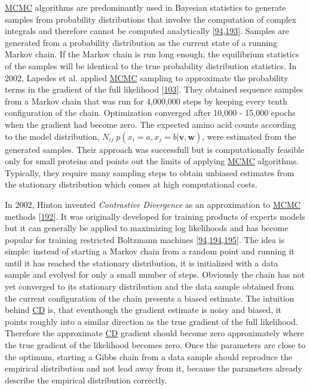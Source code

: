 \documentclass[11pt,a4paper,twoside]{book}
\newcommand{\eq}{\!=\!}
\renewcommand{\v}{\mathbf{v}}
\newcommand{\w}{\mathbf{w}}
\theoremstyle{definition}
\theoremstyle{definition}
\theoremstyle{remark}
\begin{document}
\protect\hyperlink{abbrev}{MCMC} algorithms are predominantly used in
Bayesian statistics to generate samples from probability distributions
that involve the computation of complex integrals and therefore cannot
be computed analytically
{[}\protect\hyperlink{ref-Murphy2012}{94},\protect\hyperlink{ref-Andrieu2003}{193}{]}.
Samples are generated from a probability distribution as the current
state of a running Markov chain. If the Markov chain is run long enough,
the equilibrium statistics of the samples will be identical to the true
probability distribution statistics. In 2002, Lapedes et al. applied
\protect\hyperlink{abbrev}{MCMC} sampling to approximate the probability
terms in the gradient of the full likelihood
{[}\protect\hyperlink{ref-Lapedes2012a}{103}{]}. They obtained sequence
samples from a Markov chain that was run for 4,000,000 steps by keeping
every tenth configuration of the chain. Optimization converged after
10,000 - 15,000 epochs when the gradient had become zero. The expected
amino acid counts according to the model distribution,
\(N_{ij} \; p(x_i \eq a, x_j \eq b | \v,\w)\), were estimated from the
generated samples. Their approach was successfull but is computationally
feasible only for small proteins and points out the limits of applying
\protect\hyperlink{abbrev}{MCMC} algorithms. Typically, they require
many sampling steps to obtain unbiased estimates from the stationary
distribution which comes at high computational costs.

In 2002, Hinton invented \emph{Contrastive Divergence} as an
approximation to \protect\hyperlink{abbrev}{MCMC} methods
{[}\protect\hyperlink{ref-Hinton2002}{192}{]}. It was originally
developed for training products of experts models but it can generally
be applied to maximizing log likelihoods and has become popular for
training restricted Boltzmann machines
{[}\protect\hyperlink{ref-Murphy2012}{94},\protect\hyperlink{ref-Fischer2012}{194},\protect\hyperlink{ref-Bengio2009}{195}{]}.
The idea is simple: instead of starting a Markov chain from a random
point and running it until it has reached the stationary distribution,
it is initialized with a data sample and evolved for only a small number
of steps. Obviously the chain has not yet converged to its stationary
distribution and the data sample obtained from the current configuration
of the chain presents a biased estimate. The intuition behind
\protect\hyperlink{abbrev}{CD} is, that eventhough the gradient estimate
is noisy and biased, it points roughly into a similar direction as the
true gradient of the full likelihood. Therefore the approximate
\protect\hyperlink{abbrev}{CD} gradient should become zero approximately
where the true gradient of the likelihood becomes zero. Once the
parameters are close to the optimum, starting a Gibbs chain from a data
sample should reproduce the empirical distribution and not lead away
from it, because the parameters already describe the empirical
distribution correctly.
\end{document}
